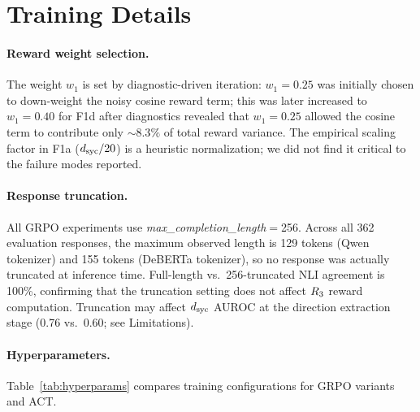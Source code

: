 \section{Training Details}
\label{app:training}

\paragraph{Reward weight selection.}
The weight $w_1$ is set by diagnostic-driven iteration: $w_1{=}0.25$ was initially chosen to down-weight the noisy cosine reward term; this was later increased to $w_1{=}0.40$ for F1d after diagnostics revealed that $w_1{=}0.25$ allowed the cosine term to contribute only ${\sim}8.3\%$ of total reward variance.
The empirical scaling factor in F1a ($d_{\text{syc}}/20$) is a heuristic normalization; we did not find it critical to the failure modes reported.

\paragraph{Response truncation.}
All GRPO experiments use \textit{max\_completion\_length}$=$256.
Across all 362 evaluation responses, the maximum observed length is 129 tokens (Qwen tokenizer) and 155 tokens (DeBERTa tokenizer), so no response was actually truncated at inference time.
Full-length vs.\ 256-truncated NLI agreement is 100\%, confirming that the truncation setting does not affect $R_3$ reward computation.
Truncation may affect $d_{\text{syc}}$ AUROC at the direction extraction stage (0.76 vs.\ 0.60; see Limitations).

\paragraph{Hyperparameters.}
Table~\ref{tab:hyperparams} compares training configurations for GRPO variants and ACT.

